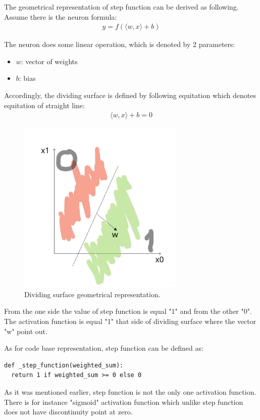 \documentclass{article}
\begin{document}
The geometrical representation of step function can be derived as following. Assume there is the neuron formula:
\begin{align*}
y = f(\langle w, x \rangle + b)
\end{align*}

The neuron does some linear operation, which is denoted by 2 parameters:
\begin{itemize}
    \item $w$: vector of weights
    \item $b$: bias
\end{itemize}
Accordingly, the dividing surface is defined by following equitation which denotes equitation of straight line:
\begin{align*}
\langle w, x \rangle + b = 0
\end{align*}

\begin{figure}[h]
    \centering \includegraphics[width=8cm]{images/dividing_surface.jpg}
    \caption {Dividing surface geometrical representation.}
\end{figure}

From the one side the value of step function is equal "1" and from the other "0". The activation function is equal "1" that side of dividing surface where the vector "w" point out.

As for code base representation, step function can be defined as:
\begin{lstlisting}
def _step_function(weighted_sum):
  return 1 if weighted_sum >= 0 else 0
\end{lstlisting}
   
As it was mentioned earlier, step function is not the only one activation function. There is for instance "sigmoid" activation function which unlike step function does not have discontinuity point at zero. 
\end{document}
